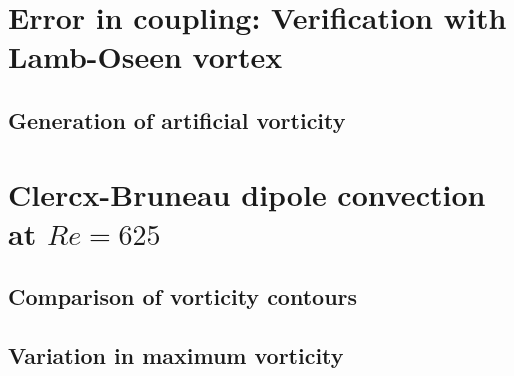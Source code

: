 %		
	
	




\section{Error in coupling: Verification with Lamb-Oseen vortex}

	\subsection{Generation of artificial vorticity}


\section{Clercx-Bruneau dipole convection at $Re=625$}

	\subsection{Comparison of vorticity contours}
	
	\subsection{Variation in maximum vorticity}
	
